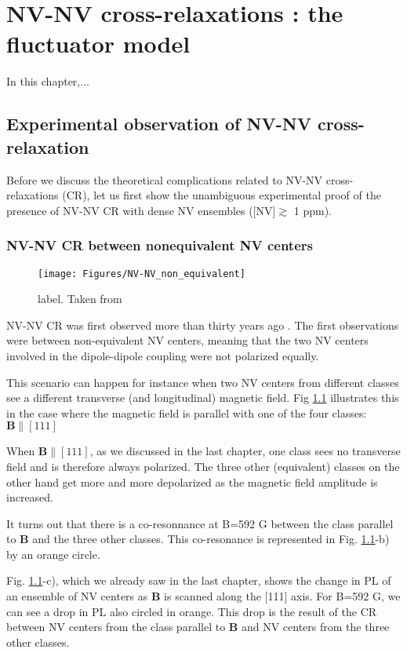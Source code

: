 \documentclass[a4paper,11pt]{report}
\title{}
\begin{document}
\chapter{NV-NV cross-relaxations : the fluctuator model}
In this chapter,...



\section{Experimental observation of NV-NV cross-relaxation}
Before we discuss the theoretical complications related to NV-NV cross-relaxations (CR), let us first show the unambiguous experimental proof of the presence of NV-NV CR with dense NV ensembles ([NV]$\gtrsim$ 1 ppm).
\subsection{NV-NV CR between nonequivalent NV centers}
\label{non_equi_valent_CR}
\begin{figure}[h]
\centering
\texttt{[image: Figures/NV-NV\_non\_equivalent]}
\caption{label. Taken from \citep{armstrong2010nv}}
\label{non equivalent NV-NV}
\end{figure}
NV-NV CR was first observed more than thirty years ago \citep{holliday1989optical, van1989cross}. The first observations were between non-equivalent NV centers, meaning that the two NV centers involved in the dipole-dipole coupling were not polarized equally.

This scenario can happen for instance when two NV centers from different classes see a different transverse (and longitudinal) magnetic field. Fig \ref{non equivalent NV-NV} illustrates this in the case where the magnetic field is parallel with one of the four classes: $\mathbf{B} \parallel [111]$

When $\mathbf{B} \parallel [111]$, as we discussed in the last chapter, one class sees no transverse field and is therefore always polarized. The three other (equivalent) classes on the other hand get more and more depolarized as the magnetic field amplitude is increased. 

It turns out that there is a co-resonnance at B=592 G between the class parallel to $\mathbf{B}$ and the three other classes. This co-resonance is represented in Fig. \ref{non equivalent NV-NV}-b) by an orange circle.

Fig. \ref{non equivalent NV-NV}-c), which we already saw in the last chapter, shows the change in PL of an ensemble of NV centers as $\mathbf{B}$ is scanned along the [111] axis. For B=592 G, we can see a drop in PL also circled in orange. This drop is the result of the CR between NV centers from the class parallel to $\mathbf{B}$ and NV centers from the three other classes. 
\end{document}
